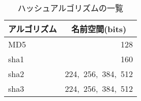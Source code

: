 \begin{table}[htb]
 \caption{ハッシュアルゴリズムの一覧}
 \centering
  \begin{tabular}{lr}
    \toprule
		\multicolumn{1}{c}{\textbf{アルゴリズム}} & \multicolumn{1}{c}{\textbf{名前空間(bits)}} \\
    \midrule
		MD5 & 128 \\
		sha1 & 160 \\
		sha2 & 224,\ 256,\ 384,\ 512 \\
		sha3 & 224,\ 256,\ 384,\ 512 \\
    \bottomrule
  \end{tabular}
 \label{tab:hash-functions}
\end{table}
